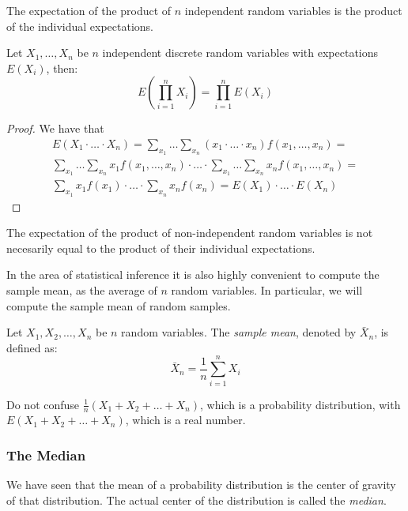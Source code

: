 The expectation of the product of $n$ independent random variables is the product of the individual expectations.

\begin{proposition}
Let $X_{1}, \ldots, X_{n}$ be $n$ independent discrete random variables with expectations $E\left(X_{i}\right)$, then:
\[
E\left(\prod_{i=1}^{n}X_{i}\right)=\prod_{i=1}^{n}E\left(X_{i}\right)
\]
\end{proposition}
\begin{proof}
We have that
\begin{multline}
E \left(X_1  \cdot \ldots \cdot X_n  \right) = 
\sum_{x_1} \ldots \sum_{x_n} \left(x_1 \cdot \ldots \cdot x_n  \right) f\left(x_1, \ldots, x_n \right) = \\
\sum_{x_1} \ldots \sum_{x_n} x_1 f\left(x_1, \ldots, x_n \right) \cdot \ldots \cdot \sum_{x_1} \ldots \sum_{x_n} x_n f\left(x_1, \ldots, x_n \right) = \\
\sum_{x_1} x_1 f\left(x_1\right) \cdot \ldots \cdot \sum_{x_n} x_n f\left( x_n \right) = 
E \left( X_1 \right) \cdot \ldots \cdot E \left( X_n \right)
\end{multline}
\end{proof}

The expectation of the product of non-independent random variables is not necesarily equal to the product of their individual expectations.

In the area of statistical inference it is also highly convenient to compute the sample mean, as the average of $n$ random variables. In particular, we will compute the sample mean of random samples.

\begin{definition}
Let $X_1, X_2, \ldots, X_n$ be $n$ random variables. The \emph{sample mean}, denoted by $\bar{X}_n$, is defined as:
\[
\bar{X}_n = \frac{1}{n} \sum_{i=1}^n X_i
\]
\end{definition}

Do not confuse $\frac{1}{n} \left( X_1 + X_2 + \ldots + X_n \right)$, which is a probability distribution, with $E \left( X_1 + X_2 + \ldots + X_n \right)$, which is a real number.


\subsubsection*{The Median}

We have seen that the mean of a probability distribution is the center of gravity of that distribution. The actual center of the distribution is called  the \emph{median}.

